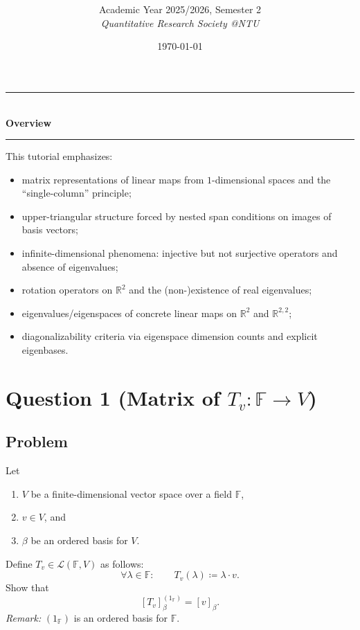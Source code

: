 \documentclass[12pt]{article}
\title{
\CourseCode\ \CourseName \\[0.3em]
\large \DocType
}
\author{
  Academic Year 2025/2026, Semester 2 \\[0.25em]
  \textit{Quantitative Research Society @NTU}
}
\date{\today}
\newcommand{\R}{\mathbb{R}}
\newcommand{\F}{\mathbb{F}}
\newcommand{\cL}{\mathcal{L}}
\begin{document}
\maketitle
\thispagestyle{plainfirst}
\pagestyle{main}

\begin{center}
  \rule{0.8\textwidth}{0.4pt}\\[4pt]
  \textbf{Overview}\\[2pt]
  \rule{0.8\textwidth}{0.4pt}
\end{center}

\noindent
This tutorial emphasizes:
\begin{itemize}[leftmargin=*]
  \item matrix representations of linear maps from $1$-dimensional spaces and the ``single-column'' principle;
  \item upper-triangular structure forced by nested span conditions on images of basis vectors;
  \item infinite-dimensional phenomena: injective but not surjective operators and absence of eigenvalues;
  \item rotation operators on $\R^2$ and the (non-)existence of real eigenvalues;
  \item eigenvalues/eigenspaces of concrete linear maps on $\R^2$ and $\R^{2,2}$;
  \item diagonalizability criteria via eigenspace dimension counts and explicit eigenbases.
\end{itemize}
\newpage
\tableofcontents
\newpage

\section{Question 1 (Matrix of $T_v:\F\to V$)}
\subsection{Problem}
Let
\begin{enumerate}[label=(\roman*)]
\item $V$ be a finite-dimensional vector space over a field $\F$,
\item $v\in V$, and
\item $\beta$ be an ordered basis for $V$.
\end{enumerate}
Define $T_v\in \cL(\F,V)$ as follows:
\[
\forall \lambda\in \F:\qquad T_v(\lambda)\coloneqq \lambda\cdot v.
\]
Show that
\[
[T_v]_{\beta}^{(1_{\F})} = [v]_{\beta}.
\]
\emph{Remark:} $(1_{\F})$ is an ordered basis for $\F$.
\end{document}
